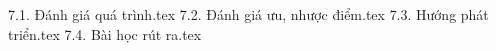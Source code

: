 

{7.1. Đánh giá quá trình.tex}
{7.2. Đánh giá ưu, nhược điểm.tex}
{7.3. Hướng phát triển.tex}
{7.4. Bài học rút ra.tex}
\label{lastPage}